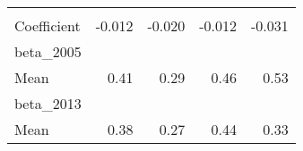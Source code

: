 \begin{tabular}{lllll}
  \multicolumn{1}{r}{} \\
\multicolumn{1}{l}{\hspace{1em}Coefficient} &
  \multicolumn{1}{|r}{-0.012} &
  \multicolumn{1}{r}{-0.020} &
  \multicolumn{1}{r}{-0.012} &
  \multicolumn{1}{r}{-0.031} \\
\multicolumn{1}{l}{beta\_2005} &
  \multicolumn{1}{|r}{} &
  \multicolumn{1}{r}{} &
  \multicolumn{1}{r}{} &
  \multicolumn{1}{r}{} \\
\multicolumn{1}{l}{\hspace{1em}Mean} &
  \multicolumn{1}{|r}{0.41} &
  \multicolumn{1}{r}{0.29} &
  \multicolumn{1}{r}{0.46} &
  \multicolumn{1}{r}{0.53} \\
\multicolumn{1}{l}{beta\_2013} &
  \multicolumn{1}{|r}{} &
  \multicolumn{1}{r}{} &
  \multicolumn{1}{r}{} &
  \multicolumn{1}{r}{} \\
\multicolumn{1}{l}{\hspace{1em}Mean} &
  \multicolumn{1}{|r}{0.38} &
  \multicolumn{1}{r}{0.27} &
  \multicolumn{1}{r}{0.44} &
  \multicolumn{1}{r}{0.33} \\
\cline{1-5}
\end{tabular}
